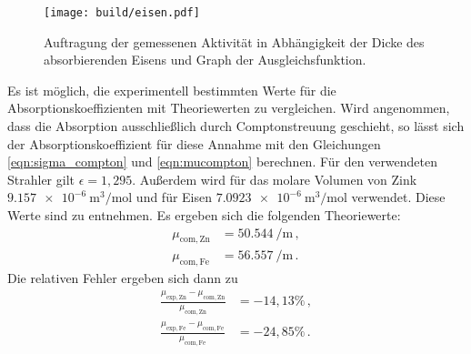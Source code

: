 \begin{figure}
  \centering
  \texttt{[image: build/eisen.pdf]}
  \caption{Auftragung der gemessenen Aktivität in Abhängigkeit der Dicke des absorbierenden Eisens und Graph der Ausgleichsfunktion.}
  \label{fig:eisen}
\end{figure}

Es ist möglich, die experimentell bestimmten Werte für die Absorptionskoeffizienten mit
Theoriewerten zu vergleichen. Wird angenommen, dass die Absorption ausschließlich durch
Comptonstreuung geschieht, so lässt sich der Absorptionskoeffizient für diese Annahme
mit den Gleichungen \eqref{eqn:sigma_compton} und \eqref{eqn:mucompton} berechnen.
Für den verwendeten Strahler gilt $\epsilon = 1{,}295$. Außerdem wird für das molare Volumen
von Zink $\SI{9.157e-6}{\cubic\meter\per\mole}$ und für Eisen $\SI{7.0923e-6}{\cubic\meter\per\mole}$
verwendet. Diese Werte sind \cite{molarvolume} zu entnehmen. Es ergeben sich die folgenden Theoriewerte:
\begin{align*}
  \mu_{\text{com},\,\text{Zn}} &=  \SI{50.544}{\per\meter}\,,\\
  \mu_{\text{com},\,\text{Fe}} &=  \SI{56.557}{\per\meter}\,.
\end{align*}
Die relativen Fehler ergeben sich dann zu
\begin{align*}
  \frac{\mu_{\text{exp},\,\text{Zn}} - \mu_{\text{com},\,\text{Zn}}}{\mu_{\text{com},\,\text{Zn}}} &= -14{,}13 \% \,,\\
  \frac{\mu_{\text{exp},\,\text{Fe}} - \mu_{\text{com},\,\text{Fe}}}{\mu_{\text{com},\,\text{Fe}}} &= -24{,}85 \% \,.
\end{align*}
